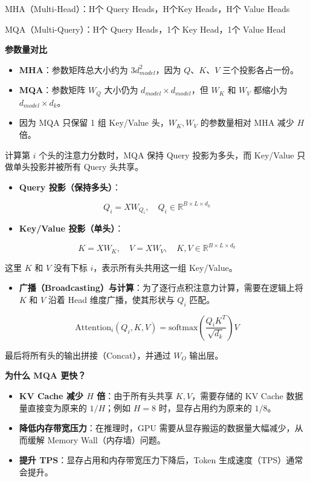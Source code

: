MHA（Multi-Head）：H个 Query Heads，H个Key Heads，H个 Value Heads

MQA（Multi-Query）：H个 Query Heads，1个 Key Head，1个 Value Head

\textbf{参数量对比}

\begin{itemize}
\tightlist
\item
  \textbf{MHA}：参数矩阵总大小约为 \(3d_{model}^2\)，因为 \(Q\)、\(K\)、\(V\) 三个投影各占一份。
\item
  \textbf{MQA}：参数矩阵 \(W_Q\) 大小仍为 \(d_{model} \times d_{model}\)，但 \(W_K\) 和 \(W_V\) 都缩小为 \(d_{model} \times d_k\)。
\item
  因为 MQA 只保留 1 组 Key/Value 头，\(W_K,W_V\) 的参数量相对 MHA 减少 \(H\) 倍。
\end{itemize}

计算第 \(i\) 个头的注意力分数时，MQA 保持 Query 投影为多头，而 Key/Value 只做单头投影并被所有 Query 头共享。

\begin{itemize}
\tightlist
\item
  \textbf{Query 投影（保持多头）}：
\end{itemize}

\[
Q_i = XW_{Q_i}, \quad Q_i \in \mathbb{R}^{B \times L \times d_k}
\]

\begin{itemize}
\tightlist
\item
  \textbf{Key/Value 投影（单头）}：
\end{itemize}

\[
K = XW_K, \quad V = XW_V, \quad K,V \in \mathbb{R}^{B \times L \times d_k}
\]

这里 \(K\) 和 \(V\) 没有下标 \(i\)，表示所有头共用这一组 Key/Value。

\begin{itemize}
\tightlist
\item
  \textbf{广播（Broadcasting）与计算}：为了逐行点积注意力计算，需要在逻辑上将 \(K\) 和 \(V\) 沿着 Head 维度广播，使其形状与 \(Q_i\) 匹配。
\end{itemize}

\[
\mathrm{Attention}_i(Q_i,K,V)=\mathrm{softmax}\left(\frac{Q_iK^T}{\sqrt{d_k}}\right)V
\]

最后将所有头的输出拼接（Concat），并通过 \(W_O\) 输出层。

\textbf{为什么 MQA 更快？}

\begin{itemize}
\tightlist
\item
  \textbf{KV Cache 减少 \(H\) 倍}：由于所有头共享 \(K,V\)，需要存储的 KV Cache 数据量直接变为原来的 \(1/H\)；例如 \(H=8\) 时，显存占用约为原来的 \(1/8\)。
\item
  \textbf{降低内存带宽压力}：在推理时，GPU 需要从显存搬运的数据量大幅减少，从而缓解 Memory Wall（内存墙）问题。
\item
  \textbf{提升 TPS}：显存占用和内存带宽压力下降后，Token 生成速度（TPS）通常会提升。
\end{itemize}

